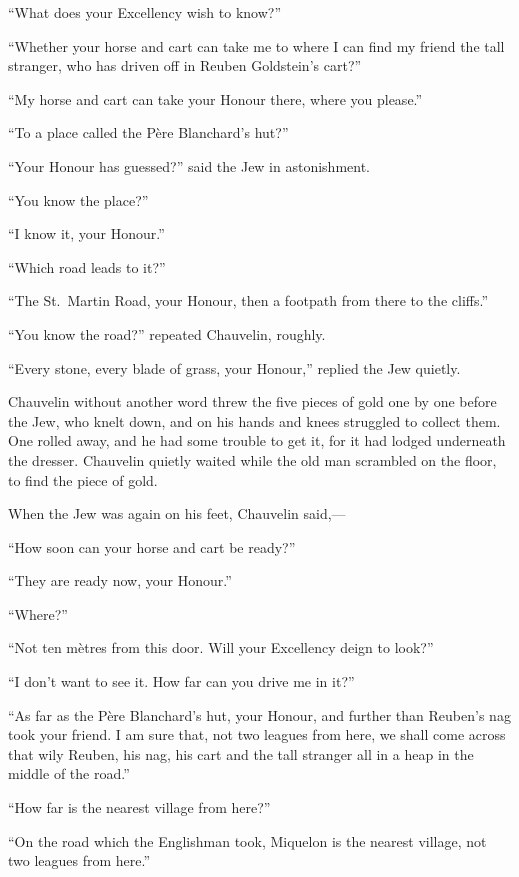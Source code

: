 \documentclass[paper=a5,BCOR=7mm,twoside,DIV=calc,12pt,usegeometry,chapterprefix,endperiod,headings=big]{scrbook}
\begin{document}
\enquote{What does your Excellency wish to know?}

\enquote{Whether your horse and cart can take me to where I can find my friend the tall stranger, who has driven off in Reuben Goldstein's cart?}

\enquote{My horse and cart can take your Honour there, where you please.}

\enquote{To a place called the Père Blanchard's hut?}

\enquote{Your Honour has guessed?} said the Jew in astonishment.

\enquote{You know the place?}

\enquote{I know it, your Honour.}

\enquote{Which road leads to it?}

\enquote{The St.~Martin Road, your Honour, then a footpath from there to the cliffs.}

\enquote{You know the road?} repeated Chauvelin, roughly.

\enquote{Every stone, every blade of grass, your Honour,} replied the Jew quietly.

Chauvelin without another word threw the five pieces of gold one by one before the Jew, who knelt down, and on his hands and knees struggled to collect them. One rolled away, and he had some trouble to get it, for it had lodged underneath the dresser. Chauvelin quietly waited while the old man scrambled on the floor, to find the piece of gold.

When the Jew was again on his feet, Chauvelin said,---

\enquote{How soon can your horse and cart be ready?}

\enquote{They are ready now, your Honour.}

\enquote{Where?}

\enquote{Not ten mètres from this door. Will your Excellency deign to look?}

\enquote{I don't want to see it. How far can you drive me in it?}

\enquote{As far as the Père Blanchard's hut, your Honour, and further than Reuben's nag took your friend. I am sure that, not two leagues from here, we shall come across that wily Reuben, his nag, his cart and the tall stranger all in a heap in the middle of the road.}

\enquote{How far is the nearest village from here?}

\enquote{On the road which the Englishman took, Miquelon is the nearest village, not two leagues from here.}
\end{document}
